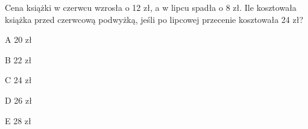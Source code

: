 \begin{tresc}
Cena książki w czerwcu wzrosła o 12 zł, a w lipcu spadła o 8 zł. Ile kosztowała książka przed czerwcową podwyżką, jeśli po lipcowej przecenie kosztowała 24 zł?
\end{tresc}
\begin{wariant}{A} 20 zł \end{wariant}
\begin{wariant}{B} 22 zł \end{wariant}
\begin{wariant}{C} 24 zł \end{wariant}
\begin{wariant}{D} 26 zł \end{wariant}
\begin{wariant}{E} 28 zł \end{wariant}
